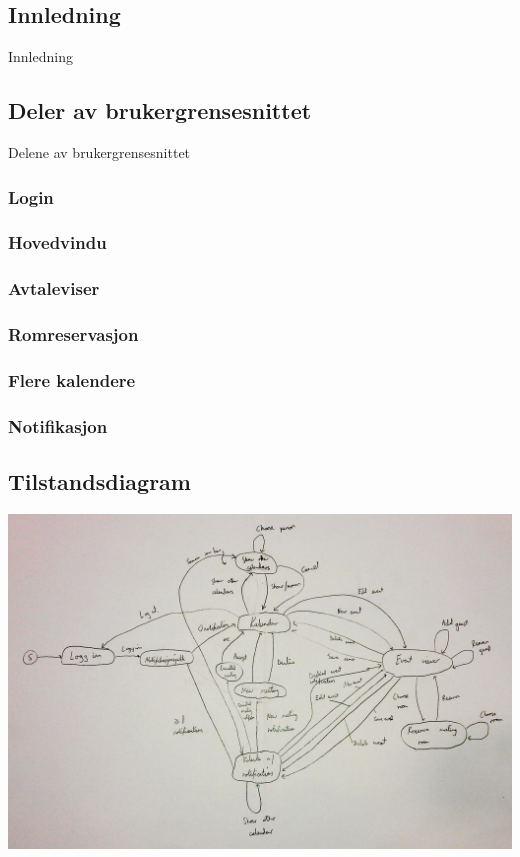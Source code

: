 \subsection{Innledning}
Innledning

\subsection{Deler av brukergrensesnittet}
Delene av brukergrensesnittet

\subsubsection{Login}


\subsubsection{Hovedvindu}


\subsubsection{Avtaleviser}


\subsubsection{Romreservasjon}


\subsubsection{Flere kalendere}


\subsubsection{Notifikasjon}

\newpage
\subsection{Tilstandsdiagram}
\includegraphics[scale=0.18]{images/tilstandsdiagram}